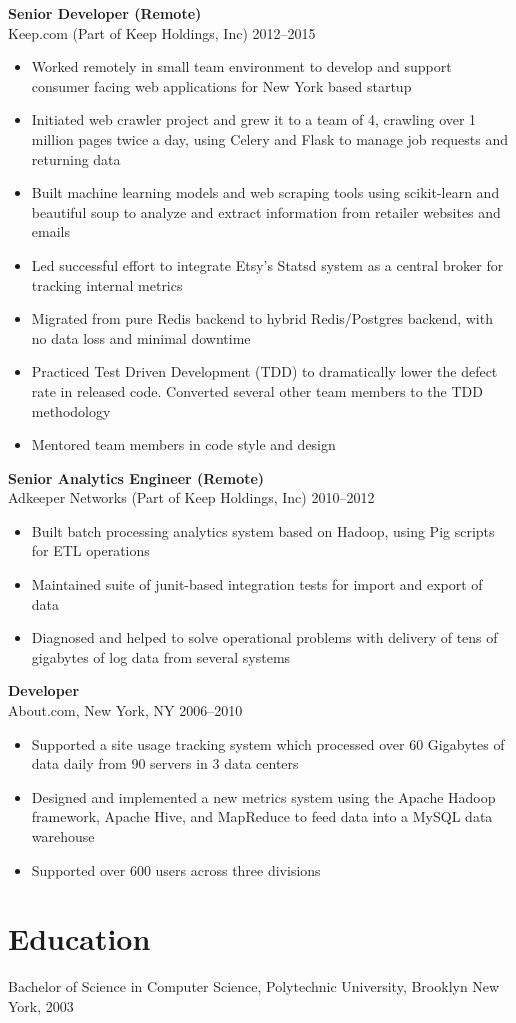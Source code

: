 \documentclass[margin]{res}
\begin{document}
\begin{resume}
{\bf Senior Developer (Remote)}\\
    Keep.com (Part of Keep Holdings, Inc) \hfill 2012--2015
\begin{itemize}
  \item Worked remotely in small team environment to develop and support
      consumer facing web applications for New York based startup
  \item Initiated web crawler project and grew it to a team of 4, crawling
    over 1 million pages twice a day, using Celery and Flask to manage job
    requests and returning data
  \item Built machine learning models and web scraping tools using
    scikit-learn and beautiful soup to analyze and extract information from
    retailer websites and emails
  \item Led successful effort to integrate Etsy's Statsd system as a central
    broker for tracking internal metrics
  \item Migrated from pure Redis backend to hybrid Redis/Postgres backend,
      with no data loss and minimal downtime
  \item Practiced Test Driven Development (TDD) to dramatically lower the
      defect rate in released code.  Converted several other team members to
      the TDD methodology
  \item Mentored team members in code style and design
\end{itemize}

{\bf Senior Analytics Engineer (Remote)}\\
Adkeeper Networks (Part of Keep Holdings, Inc) \hfill  2010--2012
\begin{itemize}
  \item Built batch processing analytics system based on Hadoop, using Pig
      scripts for ETL operations
  \item Maintained suite of junit-based integration tests for import and
      export of data
  \item Diagnosed and helped to solve operational problems with delivery of
      tens of gigabytes of log data from several systems
\end{itemize}

{\bf Developer}\\
About.com, New York, NY \hfill  2006--2010
\begin{itemize}
  \item Supported a site usage tracking system which processed
    over 60 Gigabytes of data daily from 90 servers in 3 data centers
  \item Designed and implemented a new metrics system using the Apache
    Hadoop framework, Apache Hive, and MapReduce to feed data into a MySQL data
    warehouse
  \item Supported over 600 users across three divisions
\end{itemize}

\section{Education}
Bachelor of Science in Computer Science, Polytechnic University, Brooklyn New
York, 2003

\end{resume}
\end{document}
